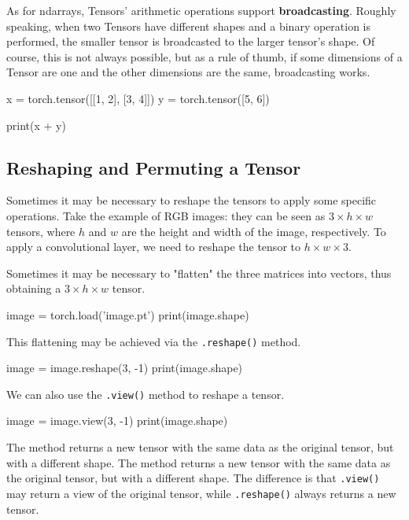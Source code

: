 As for ndarrays, Tensors' arithmetic operations support \textbf{broadcasting}. Roughly speaking, when two Tensors have different shapes and a binary operation is performed, the smaller tensor is broadcasted to the larger tensor's shape. Of course, this is not always possible, but as a rule of thumb, if some dimensions of a Tensor are one and the other dimensions are the same, broadcasting works. 
\begin{exampleblock}[Broadcasting]
    \begin{codeblock}[language=python]
x = torch.tensor([[1, 2], [3, 4]])
y = torch.tensor([5, 6])

print(x + y)
    \end{codeblock}
\end{exampleblock}

\subsection{Reshaping and Permuting a Tensor}

Sometimes it may be necessary to reshape the tensors to apply some specific operations. Take the example of RGB images: they can be seen as \texttt{$3\times h \times w$} tensors, where $h$ and $w$ are the height and width of the image, respectively. To apply a convolutional layer, we need to reshape the tensor to \texttt{$h \times w \times 3$}.

Sometimes it may be necessary to "flatten" the three matrices into vectors, thus obtaining a \texttt{$3 \times h \times w$} tensor.

\begin{codeblock}[language=python]
image = torch.load('image.pt')
print(image.shape)
\end{codeblock}

This flattening may be achieved via the \texttt{.reshape()} method.
\begin{codeblock}[language=python]
image = image.reshape(3, -1)
print(image.shape)
\end{codeblock}

We can also use the \texttt{.view()} method to reshape a tensor.

\begin{codeblock}[language=python]
image = image.view(3, -1)
print(image.shape)
\end{codeblock}

\begin{observationblock}
    The  method returns a new tensor with the same data as the original tensor, but with a different shape. The  method returns a new tensor with the same data as the original tensor, but with a different shape. The difference is that \texttt{.view()} may return a view of the original tensor, while \texttt{.reshape()} always returns a new tensor.
\end{observationblock}

